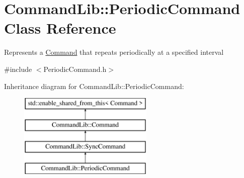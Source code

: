 \hypertarget{class_command_lib_1_1_periodic_command}{}\section{Command\+Lib\+:\+:Periodic\+Command Class Reference}
\label{class_command_lib_1_1_periodic_command}


Represents a \mbox{\hyperlink{class_command_lib_1_1_command}{Command}} that repeats periodically at a specified interval 




{\ttfamily \#include $<$Periodic\+Command.\+h$>$}

Inheritance diagram for Command\+Lib\+:\+:Periodic\+Command\+:\begin{figure}[H]
\begin{center}
\leavevmode
\includegraphics[height=4.000000cm]{class_command_lib_1_1_periodic_command}
\end{center}
\end{figure}
